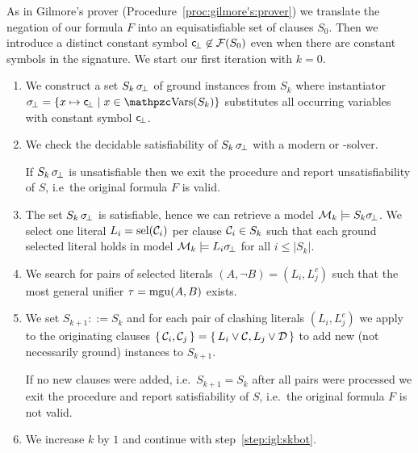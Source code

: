 \begin{procedure}\label{proc:inst:gen:loop}
	As in Gilmore's prover (Procedure~\ref{proc:gilmore's:prover})
	we translate the negation of our formula \( F \) into an equisatisfiable set of clauses
	\( S_0 \). Then we introduce a distinct constant symbol
	\( \mathsf{c} \!_\bot\not\in\mathcal{F}(S_0) \) even when there are constant symbols in the signature.
	We start our first iteration with \( k=0 \).

	\begin{enumerate}
		\item\label{step:igl:skbot}
		We construct a set \( S_{k} \, \sigma \!_\bot \) of ground instances from \( S_k \)
		where instantiator \( \subsbot = \{ x\mapsto \consbot \mid x\in\var(S_k) \} \)
		substitutes all occurring variables with constant symbol \( \mathsf{c} \!_\bot \).
%
		\item\label{step:igl:sksat} 
		We check the decidable satisfiability of
		\( S_k \, \sigma \!_\bot \)
		with a modern \SAT{} or \SMT{}-solver.

		If \( S_k \, \sigma \!_\bot \) is unsatisfiable then we exit the procedure and report
		{ unsatisfiability} of \( S \), i.e~the original formula \( F \) is valid.

		\item\label{step:igl:model} The set \( S_k \, \sigma \!_\bot \) is satisfiable, hence we can retrieve a model \( \mathcal{M}_k \models S_k\sigma \!_\bot \).
		We select one literal \( L_i = \operatorname{sel}(\mathcal{C}_i) \) per clause \( \mathcal{C}_i \in S_k \)
		such that each ground selected literal holds in model
		\( \mathcal{M}_k\models L_i\sigma \!_\bot \) for all \( i \leq | S_k | \).

		\item\label{step:igl:clashes} We search for pairs of selected literals
		\( (A, \lnot B) = (L_i, L_j^c) \)
		such that the most general unifier \( \tau = \operatorname{mgu}(A,B) \) exists.

		\item We set \( S_{k+1} ::= S_k \) and for each pair of clashing literals
		\( (L_i, L^c_j) \)
		we apply \InstGen{} to the originating clauses
		\( \{ \, \mathcal{C}_{i}, \mathcal{C}_{j} \, \} = \{ \, L_i\lor\mathcal{C}, L_j\lor\mathcal{D} \, \} \)
		to add new (not necessarily ground) instances to \( S_{k+1} \).

		If no new clauses were added, i.e.~\( S_{k+1} = S_k \) after all pairs were processed we exit the procedure and report { satisfiability} of \( S \), i.e.~the original formula \( F \) is not valid.

		\item We increase \( k \) by \( 1 \) and continue with step~\ref{step:igl:skbot}.

	\end{enumerate}
\end{procedure}

